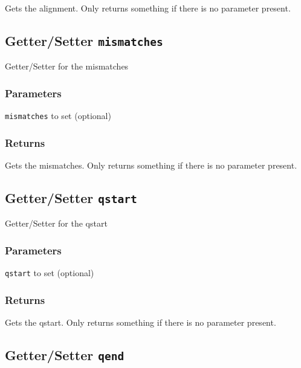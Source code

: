 Gets the alignment. Only returns something if there is no parameter present.

\subsection*{Getter/Setter \texttt{mismatches}\label{Getter_Setter_mismatches}}


Getter/Setter for the mismatches

\subsubsection*{Parameters\label{Parameters}}
\begin{description}

\item[{\texttt{mismatches} to set (optional)}] \mbox{}\end{description}
\subsubsection*{Returns\label{Returns}}


Gets the mismatches. Only returns something if there is no parameter present.

\subsection*{Getter/Setter \texttt{qstart}\label{Getter_Setter_qstart}}


Getter/Setter for the qstart

\subsubsection*{Parameters\label{Parameters}}
\begin{description}

\item[{\texttt{qstart} to set (optional)}] \mbox{}\end{description}
\subsubsection*{Returns\label{Returns}}


Gets the qstart. Only returns something if there is no parameter present.

\subsection*{Getter/Setter \texttt{qend}\label{Getter_Setter_qend}}


